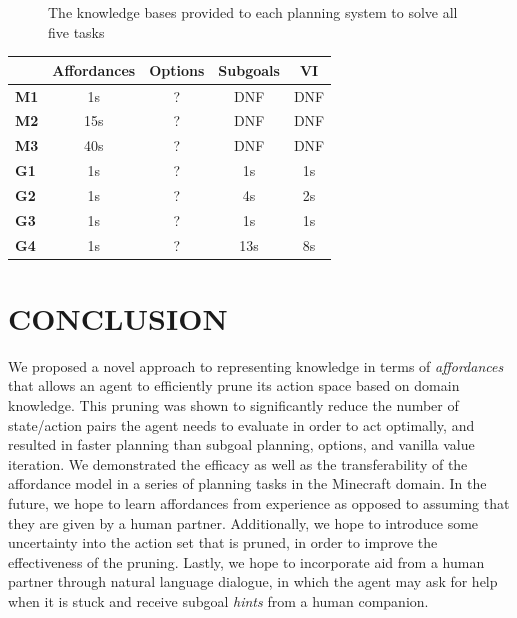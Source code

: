 \documentclass[]{article}
\begin{document}
\begin{figure}
\centering
{}
\caption{The knowledge bases provided to each planning system to solve all five tasks \label{tbl:transfer_kb}}
\end{figure}


\begin{tabular}{ l || c | c | c | c }
  & Affordances & Options & Subgoals & VI \\
  \hline
  {\bf M1} & 1s & ? & DNF & DNF  \\
  {\bf M2} & 15s & ? & DNF & DNF \\
  {\bf M3} & 40s & ? & DNF & DNF \\
  {\bf G1} & 1s & ? & 1s & 1s \\
  {\bf G2} & 1s & ? & 4s & 2s \\
  {\bf G3} & 1s & ? & 1s & 1s \\
  {\bf G4} & 1s & ? & 13s & 8s \\
\end{tabular}


\section{CONCLUSION}

We proposed a novel approach to representing
knowledge in terms of {\em
  affordances}~\citep{gibson77} that allows an agent to efficiently prune its
action space based on domain knowledge. This pruning was shown to significantly
reduce the number of state/action pairs the agent needs to evaluate
in order to act optimally, and resulted in faster planning than subgoal planning, options,
and vanilla value iteration. We demonstrated the efficacy as well as the 
transferability of the affordance model in a series of planning tasks in the Minecraft domain.
In the future, we hope to learn affordances from experience as opposed to assuming
that they are given by a human partner. Additionally, we hope to introduce some uncertainty
into the action set that is pruned, in order to improve the effectiveness of the pruning. Lastly,
we hope to incorporate aid from a human partner through natural language dialogue, in which
the agent may ask for help when it is stuck and receive subgoal {\it hints} from a human
companion.


  
\end{document}
